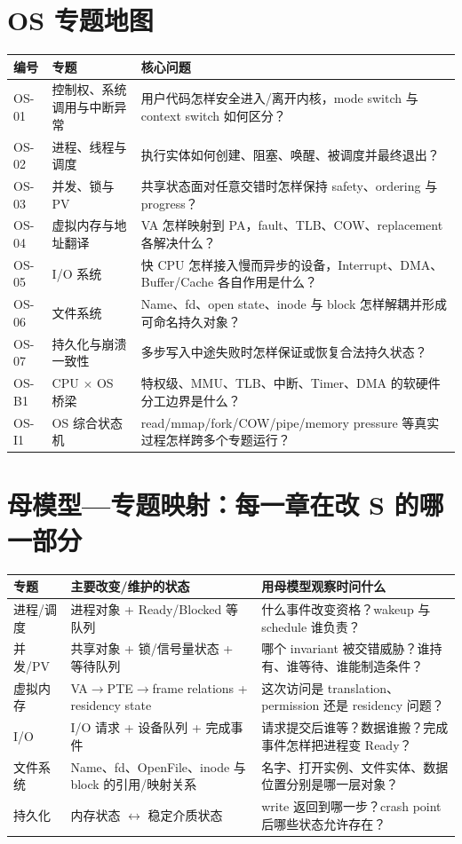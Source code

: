 \documentclass[11pt,a4paper,openany]{ctexbook}
\begin{document}
\section{OS 专题地图}
\begin{longtable}{L{1.45cm}L{4.45cm}L{\dimexpr\linewidth-7.17cm\relax}}
\toprule
\textbf{编号} & \textbf{专题} & \textbf{核心问题}\\
\midrule
OS-01 & 控制权、系统调用与中断异常 & 用户代码怎样安全进入/离开内核，mode switch 与 context switch 如何区分？\\
OS-02 & 进程、线程与调度 & 执行实体如何创建、阻塞、唤醒、被调度并最终退出？\\
OS-03 & 并发、锁与 PV & 共享状态面对任意交错时怎样保持 safety、ordering 与 progress？\\
OS-04 & 虚拟内存与地址翻译 & VA 怎样映射到 PA，fault、TLB、COW、replacement 各解决什么？\\
OS-05 & I/O 系统 & 快 CPU 怎样接入慢而异步的设备，Interrupt、DMA、Buffer/Cache 各自作用是什么？\\
OS-06 & 文件系统 & Name、fd、open state、inode 与 block 怎样解耦并形成可命名持久对象？\\
OS-07 & 持久化与崩溃一致性 & 多步写入中途失败时怎样保证或恢复合法持久状态？\\
OS-B1 & CPU $\times$ OS 桥梁 & 特权级、MMU、TLB、中断、Timer、DMA 的软硬件分工边界是什么？\\
OS-I1 & OS 综合状态机 & read/mmap/fork/COW/pipe/memory pressure 等真实过程怎样跨多个专题运行？\\
\bottomrule
\end{longtable}

\section{母模型—专题映射：每一章在改 S 的哪一部分}
\begin{longtable}{L{3.0cm}L{4.25cm}L{\dimexpr\linewidth-8.52cm\relax}}
\toprule
\textbf{专题} & \textbf{主要改变/维护的状态} & \textbf{用母模型观察时问什么}\\
\midrule
进程/调度 & 进程对象 + Ready/Blocked 等队列 & 什么事件改变资格？wakeup 与 schedule 谁负责？\\
并发/PV & 共享对象 + 锁/信号量状态 + 等待队列 & 哪个 invariant 被交错威胁？谁持有、谁等待、谁能制造条件？\\
虚拟内存 & VA$\to$PTE$\to$frame relations + residency state & 这次访问是 translation、permission 还是 residency 问题？\\
I/O & I/O 请求 + 设备队列 + 完成事件 & 请求提交后谁等？数据谁搬？完成事件怎样把进程变 Ready？\\
文件系统 & Name、fd、OpenFile、inode 与 block 的引用/映射关系 & 名字、打开实例、文件实体、数据位置分别是哪一层对象？\\
持久化 & 内存状态 $\leftrightarrow$ 稳定介质状态 & write 返回到哪一步？crash point 后哪些状态允许存在？\\
\bottomrule
\end{longtable}
\end{document}
